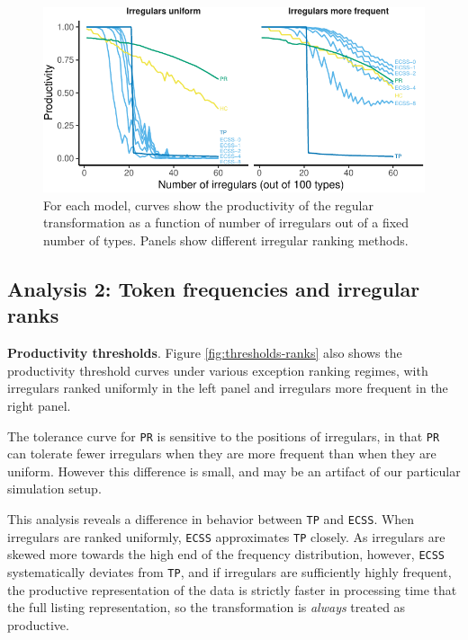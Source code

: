 \documentclass[
   11pt,
       ]{book}
\begin{document}
\begin{figure}

{\centering \includegraphics[width=\textwidth]{04-prod-comp/figures/fixed-1} 

}

\caption{For each model, curves show the productivity of the regular transformation as a function of number of irregulars out of a fixed number of types. Panels show different irregular ranking methods.}\label{fig:fixed}
\end{figure}

\hypertarget{analysis-2-token-frequencies-and-irregular-ranks}{%
\subsection{Analysis 2: Token frequencies and irregular ranks}\label{analysis-2-token-frequencies-and-irregular-ranks}}

\textbf{Productivity thresholds}. Figure \ref{fig:thresholds-ranks} also shows the
productivity threshold curves under various exception ranking regimes, with
irregulars ranked uniformly in the left panel and irregulars more frequent in
the right panel.

The tolerance curve for \texttt{PR} is sensitive to the positions of irregulars, in
that \texttt{PR} can tolerate fewer irregulars when they are more frequent than when
they are uniform. However this difference is small, and may be an artifact of
our particular simulation setup.

This analysis reveals a difference in behavior between \texttt{TP} and \texttt{ECSS}. When
irregulars are ranked uniformly, \texttt{ECSS} approximates \texttt{TP} closely. As irregulars
are skewed more towards the high end of the frequency distribution, however,
\texttt{ECSS} systematically deviates from \texttt{TP}, and if irregulars are sufficiently
highly frequent, the productive representation of the data is strictly faster in
processing time that the full listing representation, so the transformation is
\emph{always} treated as productive.
\end{document}
